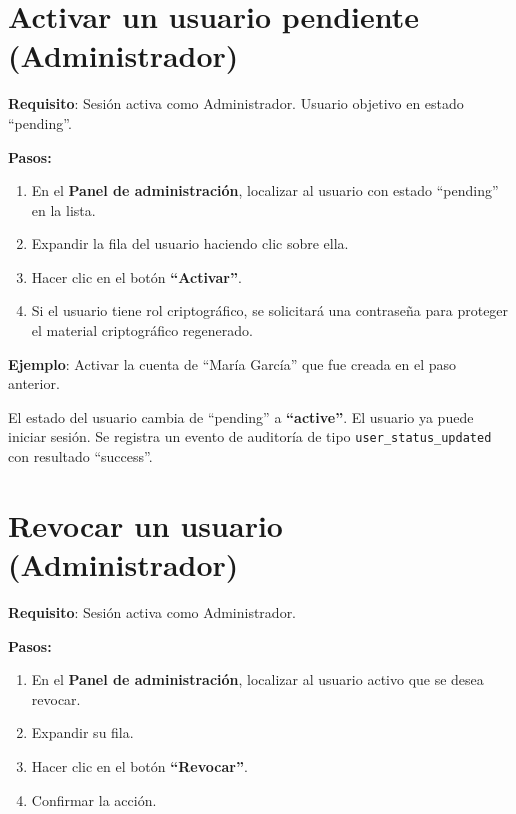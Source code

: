 \documentclass[10pt,letterpaper]{report}
\begin{document}

\section{Activar un usuario pendiente (Administrador)}

\textbf{Requisito}: Sesión activa como Administrador. Usuario objetivo en estado ``pending''.

\textbf{Pasos:}
\begin{enumerate}[leftmargin=2cm]
  \item En el \textbf{Panel de administración}, localizar al usuario con estado ``pending'' en la lista.
  \item Expandir la fila del usuario haciendo clic sobre ella.
  \item Hacer clic en el botón \textbf{``Activar''}.
  \item Si el usuario tiene rol criptográfico, se solicitará una contraseña para proteger el material criptográfico regenerado.
\end{enumerate}

\textbf{Ejemplo}: Activar la cuenta de ``María García'' que fue creada en el paso anterior.

\begin{successbox}
  El estado del usuario cambia de ``pending'' a \textbf{``active''}. El usuario ya puede iniciar sesión. Se registra un evento de auditoría de tipo \texttt{user\_status\_updated} con resultado ``success''.
\end{successbox}

\section{Revocar un usuario (Administrador)}

\textbf{Requisito}: Sesión activa como Administrador.

\textbf{Pasos:}
\begin{enumerate}[leftmargin=2cm]
  \item En el \textbf{Panel de administración}, localizar al usuario activo que se desea revocar.
  \item Expandir su fila.
  \item Hacer clic en el botón \textbf{``Revocar''}.
  \item Confirmar la acción.
\end{enumerate}
\end{document}
